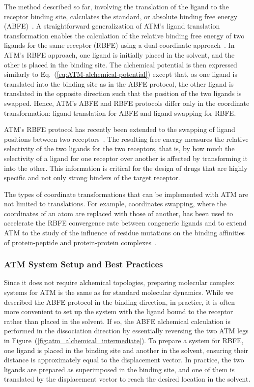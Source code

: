 \documentclass[9pt,bestpractices]{livecoms}
\begin{document}
The method described so far, involving the translation of the ligand to the receptor binding site, calculates the standard, or absolute binding free energy (ABFE)~\cite{wu2021alchemical,azimi2022application}. A straightforward generalization of ATM's ligand translation transformation enables the calculation of the relative binding free energy of two ligands for the same receptor (RBFE) using a dual-coordinate approach~\cite{azimi2022relative}. In ATM's RBFE approach, one ligand is initially placed in the solvent, and the other is placed in the binding site. The alchemical potential is then expressed similarly to Eq.~(\ref{eq:ATM-alchemical-potential}) except that, as one ligand is translated into the binding site as in the ABFE protocol, the other ligand is translated in the opposite direction such that the position of the two ligands is swapped. Hence, ATM's ABFE and RBFE protocols differ only in the coordinate transformation: ligand translation for ABFE and ligand swapping for RBFE.

ATM's RBFE protocol has recently been extended to the swapping of ligand positions between two receptors~\cite{azimi2024selectivity}. The resulting free energy measures the relative selectivity of the two ligands for the two receptors, that is, by how much the selectivity of a ligand for one receptor over another is affected by transforming it into the other. This information is critical for the design of drugs that are highly specific and not only strong binders of the target receptor.

The types of coordinate transformations that can be implemented with ATM are not limited to translations. For example, coordinates swapping, where the coordinates of an atom are replaced with those of another, has been used to accelerate the RBFE convergence rate between congeneric ligands and to extend ATM to the study of the influence of residue mutations on the binding affinities of protein-peptide and protein-protein complexes~\cite{gallicchio2025mutants}.   


\subsubsection{ATM System Setup and Best Practices}

Since it does not require alchemical topologies, preparing molecular complex systems for ATM is the same as for standard molecular dynamics. While we described the ABFE protocol in the binding direction, in practice, it is often more convenient to set up the system with the ligand bound to the receptor rather than placed in the solvent. If so, the ABFE alchemical calculation is performed in the dissociation direction by essentially reversing the two ATM legs in Figure~(\ref{fig:atm_alchemical_intermediate}). To prepare a system for RBFE, one ligand is placed in the binding site and another in the solvent, ensuring their distance is approximately equal to the displacement vector. In practice, the two ligands are prepared as superimposed in the binding site, and one of them is translated by the displacement vector to reach the desired location in the solvent.
\end{document}

